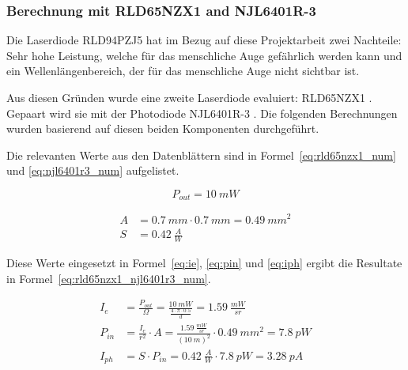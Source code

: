 \subsubsection{Berechnung mit RLD65NZX1 and NJL6401R-3}

Die Laserdiode RLD94PZJ5 hat im Bezug auf diese Projektarbeit zwei Nachteile: Sehr hohe Leistung, welche für das
menschliche Auge gefährlich werden kann und ein Wellenlängenbereich, der für das menschliche Auge nicht sichtbar ist.

Aus diesen Gründen wurde eine zweite Laserdiode evaluiert: RLD65NZX1 \cite{rohm2019rld65nzx1_datasheet}. Gepaart wird
sie mit der Photodiode NJL6401R-3 \cite{jrc2014njl6401r3_datasheet}. Die folgenden Berechnungen wurden basierend auf
diesen beiden Komponenten durchgeführt.

Die relevanten Werte aus den Datenblättern sind in Formel~\ref{eq:rld65nzx1_num} und \ref{eq:njl6401r3_num} aufgelistet.

\begin{equation}\label{eq:rld65nzx1_num}
    P_{out} = 10~mW
\end{equation}

\begin{equation}\label{eq:njl6401r3_num}
    \begin{split}
        A &= 0.7~mm \cdot 0.7~mm = 0.49~mm^2\\
        S &= 0.42~\frac{A}{W}
    \end{split}
\end{equation}

Diese Werte eingesetzt in Formel~\ref{eq:ie}, \ref{eq:pin} und \ref{eq:iph} ergibt die Resultate in
Formel~\ref{eq:rld65nzx1_njl6401r3_num}.

\begin{equation}\label{eq:rld65nzx1_njl6401r3_num}
    \begin{split}
        I_e    &= \frac{P_{out}}{\Omega} = \frac{10~mW}{\frac{4\cdot \pi \cdot 0.5}{d}} = 1.59~\frac{mW}{sr}\\
        P_{in} &= \frac{I_e}{r^2} \cdot A = \frac{1.59~\frac{mW}{sr}}{(10~m)^2} \cdot 0.49~mm^2 = 7.8~pW\\
        I_{ph} &= S \cdot P_{in} = 0.42~\frac{A}{W} \cdot 7.8~pW = 3.28~pA
    \end{split}
\end{equation}

